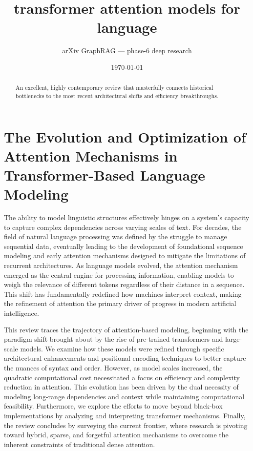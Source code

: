 \documentclass[11pt]{article}
\title{transformer attention models for language}
\author{arXiv GraphRAG --- phase-6 deep research}
\date{\today}
\begin{document}
\maketitle

\begin{abstract}
An excellent, highly contemporary review that masterfully connects historical bottlenecks to the most recent architectural shifts and efficiency breakthroughs.
\end{abstract}

\section{The Evolution and Optimization of Attention Mechanisms in Transformer-Based Language Modeling}

The ability to model linguistic structures effectively hinges on a system's capacity to capture complex dependencies across varying scales of text. For decades, the field of natural language processing was defined by the struggle to manage sequential data, eventually leading to the development of foundational sequence modeling and early attention mechanisms designed to mitigate the limitations of recurrent architectures. As language models evolved, the attention mechanism emerged as the central engine for processing information, enabling models to weigh the relevance of different tokens regardless of their distance in a sequence. This shift has fundamentally redefined how machines interpret context, making the refinement of attention the primary driver of progress in modern artificial intelligence.

This review traces the trajectory of attention-based modeling, beginning with the paradigm shift brought about by the rise of pre-trained transformers and large-scale models. We examine how these models were refined through specific architectural enhancements and positional encoding techniques to better capture the nuances of syntax and order. However, as model scales increased, the quadratic computational cost necessitated a focus on efficiency and complexity reduction in attention. This evolution has been driven by the dual necessity of modeling long-range dependencies and context while maintaining computational feasibility. Furthermore, we explore the efforts to move beyond black-box implementations by analyzing and interpreting transformer mechanisms. Finally, the review concludes by surveying the current frontier, where research is pivoting toward hybrid, sparse, and forgetful attention mechanisms to overcome the inherent constraints of traditional dense attention.
\end{document}

